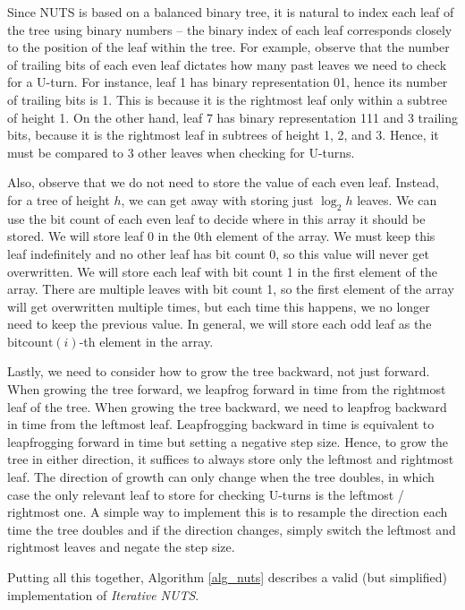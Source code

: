 \documentclass[12pt]{article}
\begin{document}
Since NUTS is based on a balanced binary tree, it is natural to index each leaf of the tree using binary numbers -- the binary index of each leaf corresponds closely to the position of the leaf within the tree. For example, observe that the number of trailing bits of each even leaf dictates how many past leaves we need to check for a U-turn. For instance, leaf 1 has binary representation 01, hence its number of trailing bits is 1. This is because it is the rightmost leaf only within a subtree of height 1. On the other hand, leaf 7 has binary representation 111 and 3 trailing bits, because it is the rightmost leaf in subtrees of height 1, 2, and 3. Hence, it must be compared to 3 other leaves when checking for U-turns.

Also, observe that we do not need to store the value of each even leaf. Instead, for a tree of height $h$, we can get away with storing just $\log_2 h$ leaves. We can use the bit count of each even leaf to decide where in this array it should be stored. We will store leaf 0 in the 0th element of the array. We must keep this leaf indefinitely and no other leaf has bit count 0, so this value will never get overwritten. We will store each leaf with bit count 1 in the first element of the array. There are multiple leaves with bit count 1, so the first element of the array will get overwritten multiple times, but each time this happens, we no longer need to keep the previous value. In general, we will store each odd leaf as the $\text{bitcount}(i)$-th element in the array.

Lastly, we need to consider how to grow the tree backward, not just forward. When growing the tree forward, we leapfrog forward in time from the rightmost leaf of the tree. When growing the tree backward, we need to leapfrog backward in time from the leftmost leaf. Leapfrogging backward in time is equivalent to leapfrogging forward in time but setting a negative step size. Hence, to grow the tree in either direction, it suffices to always store only the leftmost and rightmost leaf. The direction of growth can only change when the tree doubles, in which case the only relevant leaf to store for checking U-turns is the leftmost / rightmost one. A simple way to implement this is to resample the direction each time the tree doubles and if the direction changes, simply switch the leftmost and rightmost leaves and negate the step size.

Putting all this together, Algorithm \ref{alg_nuts} describes a valid (but simplified) implementation of \textit{Iterative NUTS}.
\end{document}
